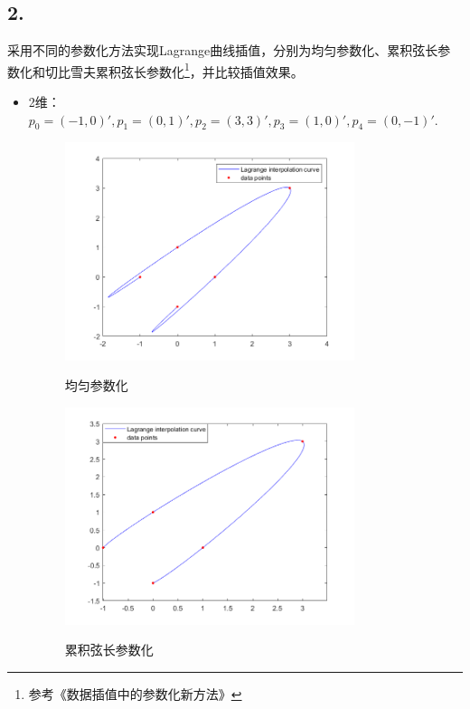 \documentclass[utf8]{ctexart}
\begin{document}
\subsection*{2.}
采用不同的参数化方法实现Lagrange曲线插值，分别为均匀参数化、累积弦长参数化和切比雪夫累积弦长参数化\footnote{参考《数据插值中的参数化新方法》}，并比较插值效果。
\begin{itemize}
    \item 2维：$p_0 = (-1,0)',
    p_1 = (0,1)',
    p_2 = (3,3)',
    p_3 = (1,0)',
    p_4 = (0,-1)'.$

    \begin{figure}[H]
        \centering
        \includegraphics[width=0.8\textwidth]{lagrange_2d_uniform.png}
        \label{fig1}
        \caption{均匀参数化}
    \end{figure}
    \begin{figure}[H]
        \centering
        \includegraphics[width=0.8\textwidth]{lagrange_2d_chord.png}
        \label{fig2}
        \caption{累积弦长参数化}
    \end{figure}

\end{itemize}
\end{document}
